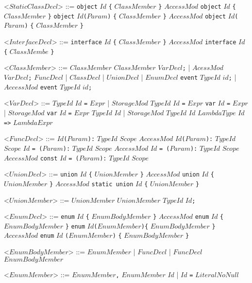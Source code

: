 \documentclass{article}
\newcommand{\gtext}[1]{<$#1$>}
\newcommand{\glit}[1]{\texttt{#1}}
\begin{document}
\begin{grammar}
	\gtext{StaticClassDecl} ::= \glit{object} $Id$ \glit{\{} $ClassMember$ \glit{\}}
	\alt $AccessMod$ \glit{object} $Id$ \glit{\{} $ClassMember$ \glit{\}}
	\alt \glit{object} $Id$\glit{(}$Param$\glit{)} \glit{\{} $ClassMember$ \glit{\}}
	\alt $AccessMod$ \glit{object} $Id$\glit{(}$Param$\glit{)} \glit{\{} $ClassMember$ \glit{\}}
	
	\gtext{InterfaceDecl} ::= \glit{interface} $Id$ \glit{\{} $ClassMember$ \glit{\}}
	\alt $AccessMod$ \glit{interface} $Id$ \glit{\{} $ClassMembe$ \glit{\}}
	
	\gtext{ClassMember} ::= $ClassMember$ $ClassMember$
	\alt $VarDecl$\glit{;} | $AcessMod$ $VarDecl$\glit{;}
	\alt $FuncDecl$ | $ClassDecl$ | $UnionDecl$ | $EnumDecl$
	\alt \glit{event} $TypeId$ $id$\glit{;} | $AccessMod$ \glit{event} $TypeId$ $id$\glit{;}
	
	\newpage	
	
	\gtext{VarDecl} ::= $TypeId$ $Id$ \glit{=} $Expr$ | $StorageMod$ $TypeId$ $Id$ \glit{=} $Expr$
	\alt \glit{var} $Id$ \glit{=} $Expr$ | $StorageMod$ \glit{var} $Id$ \glit{=} $Expr$
	\alt $TypeId$ $Id$ | $StorageMod$ $TypeId$ $Id$
	\alt $LambdaType$ $Id$ \glit{=>} $LambdaExpr$

	\gtext{FuncDecl} ::=  $Id$\glit{(}$Param$\glit{):} $TypeId$ $Scope$ %
	\alt $AccessMod$ $Id$\glit{(}$Param$\glit{):} $TypeId$ $Scope$ %
	\alt $Id$ \glit{= (}$Param$\glit{):} $TypeId$ $Scope$  %
	\alt $AccessMod$ $Id$ \glit{= (}$Param$\glit{):} $TypeId$ $Scope$  %
	\alt $AccessMod$ \glit{const} $Id$ \glit{= (}$Param$\glit{):} $TypeId$ $Scope$  %
	
	\gtext{UnionDecl} ::= \glit{union} $Id$ \glit{\{} $UnionMember$ \glit{\}}
	\alt $AccessMod$ \glit{union} $Id$ \glit{\{} $UnionMember$ \glit{\}}
	\alt $AccessMod$ \glit{static union} $Id$ \glit{\{} $UnionMember$ \glit{\}}
	
	\gtext{UnionMember} ::= $UnionMember$ $UnionMember$
	\alt $TypeId$ $Id$\glit{;}	
	
	\gtext{EnumDecl} ::= \glit{enum} $Id$ \glit{\{} $EnumBodyMember$ \glit{\}}
	\alt $AccessMod$ \glit{enum} $Id$ \glit{\{} $EnumBodyMember$ \glit{\}}
	\alt \glit{enum} $Id$\glit{(}$EnumMember$\glit{)\{} $EnumBodyMember$ \glit{\}}
	\alt $AccessMod$ \glit{enum} $Id$ \glit{(}$EnumMember$\glit{)} \glit{\{} $EnumBodyMember$ \glit{\}}
	
	\gtext{EnumBodyMember} ::= $EnumMember$ | $FuncDecl$ | $FuncDecl$ $EnumBodyMember$
	
	\gtext{EnumMember} ::=  $EnumMember$\glit{,} $EnumMember$
	\alt $Id$ | $Id$ \glit{=} $LiteralNoNull$
	

\end{grammar}
\end{document}
